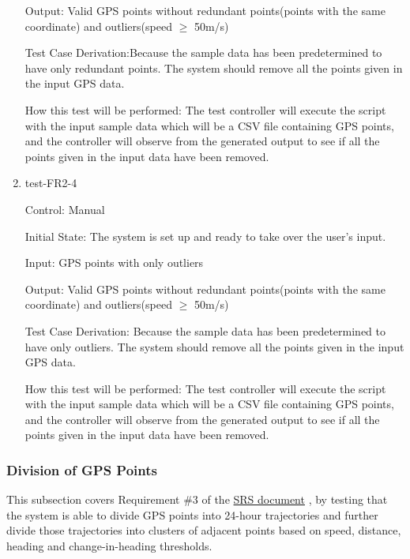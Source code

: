 \documentclass[12pt, titlepage]{article}
\begin{document}
\begin{enumerate}
Output: Valid GPS points without redundant points(points with the same coordinate) and outliers(speed $\geq$ 50m/s)

Test Case Derivation:Because the sample data has been predetermined to have only redundant points. The system should remove all the points given in the input GPS data.

How this test will be performed: The test controller will execute the script with the input sample data which will be a CSV file containing GPS points, and the controller will observe from the generated output to see if all the points given in the input data have been removed.

\item{test-FR2-4} \label{test-FR2-4}

Control: Manual
					
Initial State: The system is set up and ready to take over the user's input.
					
Input: GPS points with only outliers
					
Output: Valid GPS points without redundant points(points with the same coordinate) and outliers(speed $\geq$ 50m/s)

Test Case Derivation: Because the sample data has been predetermined to have only outliers. The system should remove all the points given in the input GPS data.

How this test will be performed: The test controller will execute the script with the input sample data which will be a CSV file containing GPS points, and the controller will observe from the generated output to see if all the points given in the input data have been removed.

\end{enumerate}

\subsubsection{Division of GPS Points}

This subsection covers Requirement \#3 of the \href{https://github.com/paezha/PyERT-BLACK/blob/main/docs/SRS/SRS.pdf}{SRS document} \citep{SRS}, by testing that the system is able to divide GPS points into 24-hour trajectories and further divide those trajectories into clusters of adjacent points based on speed, distance, heading and change-in-heading thresholds.
\end{document}
